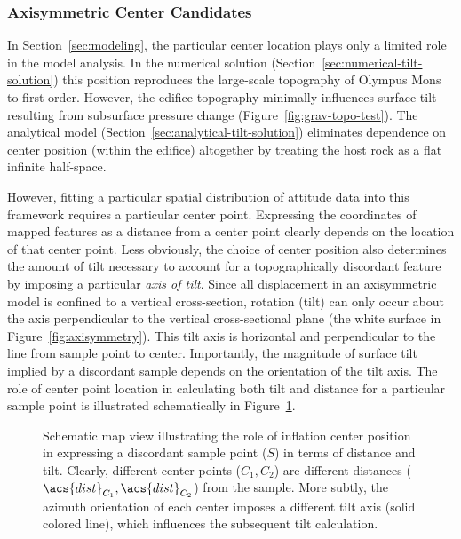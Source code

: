 \subsubsection{Axisymmetric Center Candidates}

In Section~\ref{sec:modeling}, the particular center location plays only a limited role in the model analysis. In the numerical solution (Section~\ref{sec:numerical-tilt-solution}) this position reproduces the large-scale topography of Olympus Mons to first order. However, the edifice topography minimally influences surface tilt resulting from subsurface pressure change (Figure~\ref{fig:grav-topo-test}). The analytical model (Section~\ref{sec:analytical-tilt-solution}) eliminates dependence on center position (within the edifice) altogether by treating the host rock as a flat infinite half-space.

However, fitting a particular spatial distribution of attitude data into this framework requires a particular center point. Expressing the coordinates of mapped features as a distance from a center point clearly depends on the location of that center point. Less obviously, the choice of center position also determines the amount of tilt necessary to account for a topographically discordant feature by imposing a particular \emph{axis of tilt}. Since all displacement in an axisymmetric model is confined to a vertical cross-section, rotation (tilt) can only occur about the axis perpendicular to the vertical cross-sectional plane (the white surface in Figure~\ref{fig:axisymmetry}). This tilt axis is horizontal and perpendicular to the line from sample point to center. Importantly, the magnitude of surface tilt implied by a discordant sample depends on the orientation of the tilt axis. The role of center point location in calculating both tilt and distance for a particular sample point is illustrated schematically in Figure~\ref{fig:center-significance}.

\begin{figure}
    \caption[Significance of center position for tilt, distance calculations]{Schematic map view illustrating the role of inflation center position in expressing a discordant sample point ($S$) in terms of distance and tilt. Clearly, different center points ($C_1, C_2$) are different distances ($\acs{dist}_{C_1},\acs{dist}_{C_2}$) from the sample. More subtly, the azimuth orientation of each center imposes a different tilt axis (solid colored line), which influences the subsequent tilt calculation.}%
    \label{fig:center-significance}
\end{figure}


